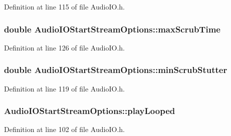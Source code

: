 Definition at line 115 of file Audio\+I\+O.\+h.

\subsubsection[{\texorpdfstring{max\+Scrub\+Time}{maxScrubTime}}]{\setlength{\rightskip}{0pt plus 5cm}double Audio\+I\+O\+Start\+Stream\+Options\+::max\+Scrub\+Time}\hypertarget{struct_audio_i_o_start_stream_options_af3404830ea234ae73cf9a6a19b2f804c}{}\label{struct_audio_i_o_start_stream_options_af3404830ea234ae73cf9a6a19b2f804c}


Definition at line 126 of file Audio\+I\+O.\+h.

\subsubsection[{\texorpdfstring{min\+Scrub\+Stutter}{minScrubStutter}}]{\setlength{\rightskip}{0pt plus 5cm}double Audio\+I\+O\+Start\+Stream\+Options\+::min\+Scrub\+Stutter}\hypertarget{struct_audio_i_o_start_stream_options_a0f8bd5ad350f0a1739b173e9440fa0cd}{}\label{struct_audio_i_o_start_stream_options_a0f8bd5ad350f0a1739b173e9440fa0cd}


Definition at line 119 of file Audio\+I\+O.\+h.

\subsubsection[{\texorpdfstring{play\+Looped}{playLooped}}]{ Audio\+I\+O\+Start\+Stream\+Options\+::play\+Looped}\hypertarget{struct_audio_i_o_start_stream_options_a51e6ebc52db021a9c18cdfa1e70c5ace}{}\label{struct_audio_i_o_start_stream_options_a51e6ebc52db021a9c18cdfa1e70c5ace}


Definition at line 102 of file Audio\+I\+O.\+h.

